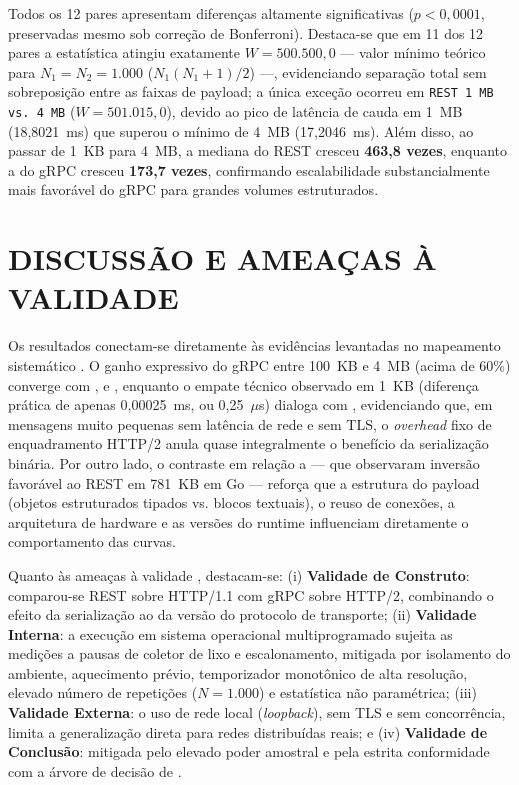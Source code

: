 \documentclass[a4paper, 12pt]{article}
\begin{document}
Todos os 12 pares apresentam diferenças altamente significativas ($p < 0{,}0001$, preservadas mesmo sob correção de Bonferroni). Destaca-se que em 11 dos 12 pares a estatística atingiu exatamente $W = 500.500{,}0$ — valor mínimo teórico para $N_1 = N_2 = 1.000$ ($N_1(N_1+1)/2$) —, evidenciando separação total sem sobreposição entre as faixas de payload; a única exceção ocorreu em \texttt{REST 1~MB vs. 4~MB} ($W = 501.015{,}0$), devido ao pico de latência de cauda em 1~MB (18,8021~ms) que superou o mínimo de 4~MB (17,2046~ms). Além disso, ao passar de 1~KB para 4~MB, a mediana do REST cresceu \textbf{463,8 vezes}, enquanto a do gRPC cresceu \textbf{173,7 vezes}, confirmando escalabilidade substancialmente mais favorável do gRPC para grandes volumes estruturados.

\section{DISCUSSÃO E AMEAÇAS À VALIDADE}

Os resultados conectam-se diretamente às evidências levantadas no mapeamento sistemático \cite{coimbra2026}. O ganho expressivo do gRPC entre 100~KB e 4~MB (acima de 60\%) converge com ,  e , enquanto o empate técnico observado em 1~KB (diferença prática de apenas 0,00025~ms, ou 0,25~$\mu$s) dialoga com , evidenciando que, em mensagens muito pequenas sem latência de rede e sem TLS, o \textit{overhead} fixo de enquadramento HTTP/2 anula quase integralmente o benefício da serialização binária. Por outro lado, o contraste em relação a  — que observaram inversão favorável ao REST em 781~KB em Go — reforça que a estrutura do payload (objetos estruturados tipados vs. blocos textuais), o reuso de conexões, a arquitetura de hardware e as versões do runtime influenciam diretamente o comportamento das curvas.

Quanto às ameaças à validade \cite{wohlin2012}, destacam-se: (i) \textbf{Validade de Construto}: comparou-se REST sobre HTTP/1.1 com gRPC sobre HTTP/2, combinando o efeito da serialização ao da versão do protocolo de transporte; (ii) \textbf{Validade Interna}: a execução em sistema operacional multiprogramado sujeita as medições a pausas de coletor de lixo e escalonamento, mitigada por isolamento do ambiente, aquecimento prévio, temporizador monotônico de alta resolução, elevado número de repetições ($N = 1.000$) e estatística não paramétrica; (iii) \textbf{Validade Externa}: o uso de rede local (\textit{loopback}), sem TLS e sem concorrência, limita a generalização direta para redes distribuídas reais; e (iv) \textbf{Validade de Conclusão}: mitigada pelo elevado poder amostral e pela estrita conformidade com a árvore de decisão de .
\end{document}
